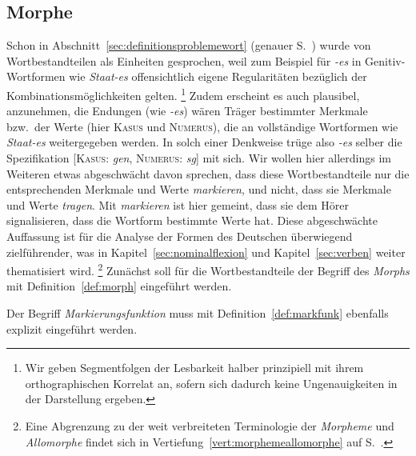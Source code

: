 \subsection{Morphe}

\label{sec:morphe}

Schon in Abschnitt~\ref{sec:definitionsproblemewort} (genauer S.~\pageref{arbref:9234645}) wurde von Wortbestandteilen als Einheiten gesprochen, weil zum Beispiel für \textit{-es} in Genitiv-Wortformen wie \textit{Staat-es} offensichtlich eigene Regularitäten bezüglich der Kombinationsmöglichkeiten gelten.%
\footnote{Wir geben Segmentfolgen der Lesbarkeit halber prinzipiell mit ihrem orthographischen Korrelat an, sofern sich dadurch keine Ungenauigkeiten in der Darstellung ergeben.}
Zudem erscheint es auch plausibel, anzunehmen, die Endungen (wie \textit{-es}) wären Träger bestimmter Merkmale bzw.\ der Werte (hier \textsc{Kasus} und \textsc{Numerus}), die an vollständige Wortformen wie \textit{Staat-es} weitergegeben werden.
In solch einer Denkweise trüge also \textit{-es} selber die Spezifikation [\textsc{Kasus}: \textit{gen}, \textsc{Numerus}: \textit{sg}] mit sich.
Wir wollen hier allerdings im Weiteren etwas abgeschwächt davon sprechen, dass diese Wortbestandteile nur die entsprechenden Merkmale und Werte \textit{markieren}, und nicht, dass sie Merkmale und Werte \textit{tragen}.
Mit \textit{markieren} ist hier gemeint, dass sie dem Hörer signalisieren, dass die Wortform bestimmte Werte hat.
Diese abgeschwächte Auffassung ist für die Analyse der Formen des Deutschen überwiegend zielführender, was in Kapitel~\ref{sec:nominalflexion} und Kapitel~\ref{sec:verben} weiter thematisiert wird.%
\footnote{Eine Abgrenzung zu der weit verbreiteten Terminologie der \textit{Morpheme} und \textit{Allomorphe} findet sich in Vertiefung~\ref{vert:morphemeallomorphe} auf S.~\pageref{vert:morphemeallomorphe}.}
Zunächst soll für die Wortbestandteile der Begriff des \textit{Morphs} mit Definition~\ref{def:morph} eingeführt werden.



Der Begriff \textit{Markierungsfunktion} muss mit Definition~\ref{def:markfunk} ebenfalls explizit eingeführt werden.


